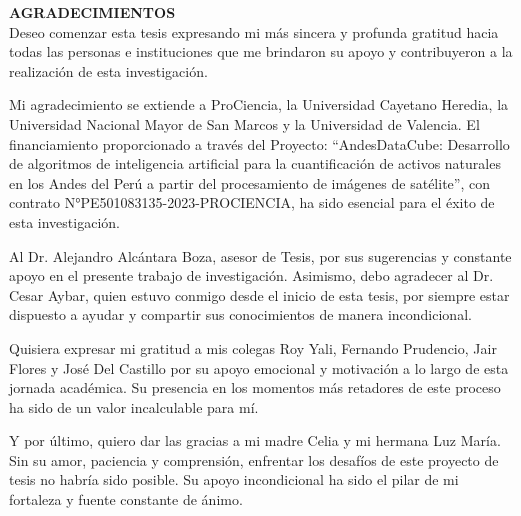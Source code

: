 \begin{agradecimientos}
    \vspace{50 mm}
    \normalsize\textbf{AGRADECIMIENTOS} \\
    
    Deseo comenzar esta tesis expresando mi más sincera y profunda gratitud hacia todas las personas e instituciones que me brindaron su apoyo y contribuyeron a la realización de esta investigación.
    
    Mi agradecimiento se extiende a ProCiencia, la Universidad Cayetano Heredia, la Universidad Nacional Mayor de San Marcos y la Universidad de Valencia. El financiamiento proporcionado a través del Proyecto: “AndesDataCube: Desarrollo de algoritmos de inteligencia artificial para la cuantificación de activos naturales en los Andes del Perú a partir del procesamiento de imágenes de satélite”, con contrato N°PE501083135-2023-PROCIENCIA, ha sido esencial para el éxito de esta investigación.
    
    Al Dr. Alejandro Alcántara Boza, asesor de Tesis, por sus sugerencias y constante apoyo en el presente trabajo de investigación. Asimismo, debo agradecer al Dr. Cesar Aybar, quien estuvo conmigo desde el inicio de esta tesis, por siempre estar dispuesto a ayudar y compartir sus conocimientos de manera incondicional.
    
    Quisiera expresar mi gratitud a mis colegas Roy Yali, Fernando Prudencio, Jair Flores y José Del Castillo por su apoyo emocional y motivación a lo largo de esta jornada académica. Su presencia en los momentos más retadores de este proceso ha sido de un valor incalculable para mí.
    
    Y por último, quiero dar las gracias a mi madre Celia y mi hermana Luz María. Sin su amor, paciencia y comprensión, enfrentar los desafíos de este proyecto de tesis no habría sido posible. Su apoyo incondicional ha sido el pilar de mi fortaleza y fuente constante de ánimo.
    
\end{agradecimientos}